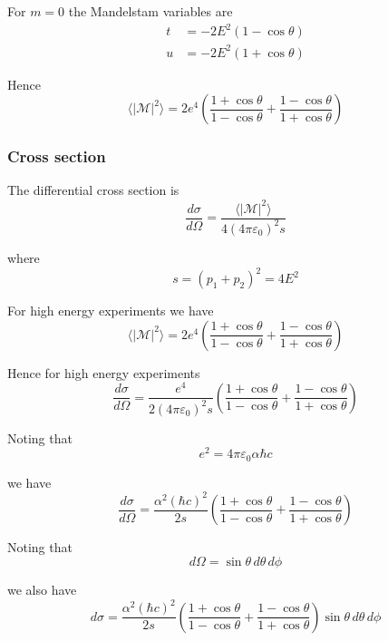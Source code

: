 For $m=0$ the Mandelstam variables are
\begin{align*}
t&=-2E^2(1-\cos\theta)
\\
u&=-2E^2(1+\cos\theta)
\end{align*}

Hence
\begin{equation*}
\langle|\mathcal{M}|^2\rangle
=2e^4\left(
\frac{1+\cos\theta}{1-\cos\theta}+
\frac{1-\cos\theta}{1+\cos\theta}
\right)
\end{equation*}

\subsubsection*{Cross section}
The differential cross section is
\begin{equation*}
\frac{d\sigma}{d\Omega}=\frac{\langle|\mathcal{M}|^2\rangle}{4(4\pi\varepsilon_0)^2s}
\end{equation*}

where
\begin{equation*}
s=(p_1+p_2)^2=4E^2
\end{equation*}

For high energy experiments we have
\begin{equation*}
\langle|\mathcal{M}|^2\rangle=2e^4\left(
\frac{1+\cos\theta}{1-\cos\theta}+
\frac{1-\cos\theta}{1+\cos\theta}
\right)
\end{equation*}

Hence for high energy experiments
\begin{equation*}
\frac{d\sigma}{d\Omega}
=\frac{e^4}{2(4\pi\varepsilon_0)^2s}\left(\frac{1+\cos\theta}{1-\cos\theta}+\frac{1-\cos\theta}{1+\cos\theta}\right)
\end{equation*}

Noting that
\begin{equation*}
e^2=4\pi\varepsilon_0\alpha\hbar c
\end{equation*}

we have
\begin{equation*}
\frac{d\sigma}{d\Omega}
=
\frac{\alpha^2(\hbar c)^2}{2s}
\left(
\frac{1+\cos\theta}{1-\cos\theta}+
\frac{1-\cos\theta}{1+\cos\theta}
\right)
\end{equation*}

Noting that
\begin{equation*}
d\Omega=\sin\theta\,d\theta\,d\phi
\end{equation*}

we also have
\begin{equation*}
d\sigma=
\frac{\alpha^2(\hbar c)^2}{2s}
\left(
\frac{1+\cos\theta}{1-\cos\theta}+
\frac{1-\cos\theta}{1+\cos\theta}
\right)\sin\theta\,d\theta\,d\phi
\end{equation*}

